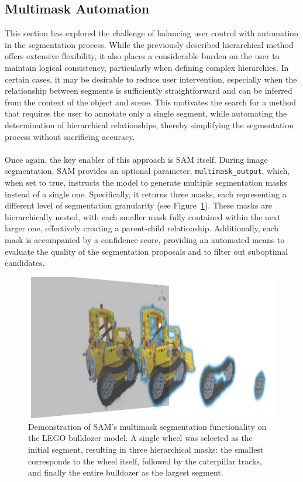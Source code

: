 \documentclass[12pt]{article}
\begin{document}
\subsection{Multimask Automation}
This section has explored the challenge of balancing user control with automation in the segmentation process. While the previously described hierarchical method offers extensive flexibility, it also places a considerable burden on the user to maintain logical consistency, particularly when defining complex hierarchies. In certain cases, it may be desirable to reduce user intervention, especially when the relationship between segments is sufficiently straightforward and can be inferred from the context of the object and scene. This motivates the search for a method that requires the user to annotate only a single segment, while automating the determination of hierarchical relationships, thereby simplifying the segmentation process without sacrificing accuracy.
\\\\
Once again, the key enabler of this approach is SAM itself. During image segmentation, SAM provides an optional parameter, \texttt{multimask\_output}, which, when set to true, instructs the model to generate multiple segmentation masks instead of a single one. Specifically, it returns three masks, each representing a different level of segmentation granularity (see Figure~\ref{fig:multidemo}). These masks are hierarchically nested, with each smaller mask fully contained within the next larger one, effectively creating a parent-child relationship. Additionally, each mask is accompanied by a confidence score, providing an automated means to evaluate the quality of the segmentation proposals and to filter out suboptimal candidates.
\begin{figure}[h!]
	\centering
	\includegraphics[width=\textwidth]{Images/multidemo.png}
	\caption{Demonstration of SAM’s multimask segmentation functionality on the LEGO bulldozer model. A single wheel was selected as the initial segment, resulting in three hierarchical masks: the smallest corresponds to the wheel itself, followed by the caterpillar tracks, and finally the entire bulldozer as the largest segment.
	}
	\label{fig:multidemo}
\end{figure}
\end{document}
